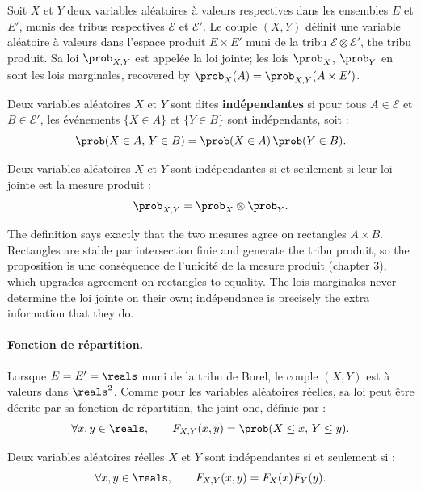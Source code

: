 Soit $X$ et $Y$ deux variables aléatoires à valeurs respectives dans les
ensembles $E$ et $E'$, munis des tribus respectives $\mathcal{E}$ et
$\mathcal{E}'$. Le couple $(X,Y)$ définit une variable aléatoire à valeurs dans
l'espace produit $E \times E'$ muni de la tribu $\mathcal{E} \otimes
\mathcal{E}'$, the tribu produit. Sa loi $\prob_{X,Y}$ est appelée la loi jointe;
les lois $\prob_{X}$, $\prob_{Y}$ en sont les lois marginales, recovered by
$\prob_{X}(A) = \prob_{X,Y}(A \times E')$.

\begin{definition}
  Deux variables aléatoires $X$ et $Y$ sont dites \textbf{indépendantes} si pour
  tous $A \in \mathcal{E}$ et $B \in \mathcal{E}'$, les événements $\{X \in A\}$
  et $\{Y \in B\}$ sont indépendants, soit :
  \[
    \prob(X \in A,\, Y \in B) = \prob(X \in A)\,\prob(Y \in B).
  \]
\end{definition}

\begin{prop}
  Deux variables aléatoires $X$ et $Y$ sont indépendantes si et seulement si leur
  loi jointe est la mesure produit :
  \[
    \prob_{X,Y} = \prob_{X} \otimes \prob_{Y} .
  \]
\end{prop}

\begin{remark}
  The definition says exactly that the two mesures agree on rectangles
  $A \times B$. Rectangles are stable par intersection finie and generate the
  tribu produit, so the proposition is une conséquence de l'unicité de la mesure
  produit (chapter 3), which upgrades agreement on rectangles to equality. The
  lois marginales never determine the loi jointe on their own; indépendance is
  precisely the extra information that they do.
\end{remark}

\paragraph{Fonction de répartition.}
Lorsque $E = E' = \reals$ muni de la tribu de Borel, le couple $(X,Y)$ est à
valeurs dans $\reals^{2}$. Comme pour les variables aléatoires réelles, sa loi
peut être décrite par sa fonction de répartition, the joint one, définie par :
\[
  \forall x,y \in \reals, \qquad F_{X,Y}(x,y) = \prob(X \leq x,\, Y \leq y).
\]

\begin{prop}
  Deux variables aléatoires réelles $X$ et $Y$ sont indépendantes si et seulement
  si :
  \[
    \forall x,y \in \reals, \qquad F_{X,Y}(x,y) = F_{X}(x) F_{Y}(y).
  \]
\end{prop}

